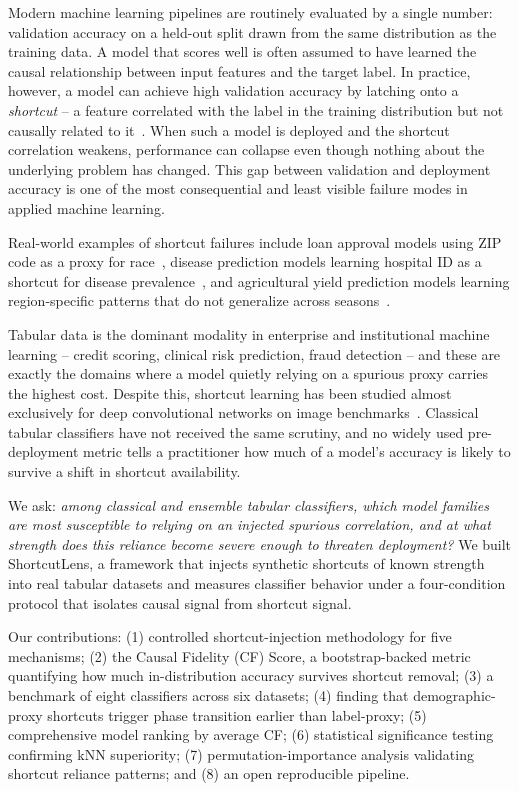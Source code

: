\documentclass[conference]{IEEEtran}
\begin{document}
Modern machine learning pipelines are routinely evaluated by a single number: validation accuracy on a held-out split drawn from the same distribution as the training data. A model that scores well is often assumed to have learned the causal relationship between input features and the target label. In practice, however, a model can achieve high validation accuracy by latching onto a \textit{shortcut} -- a feature correlated with the label in the training distribution but not causally related to it~\cite{geirhos2020shortcut}. When such a model is deployed and the shortcut correlation weakens, performance can collapse even though nothing about the underlying problem has changed. This gap between validation and deployment accuracy is one of the most consequential and least visible failure modes in applied machine learning.

Real-world examples of shortcut failures include loan approval models using ZIP code as a proxy for race~\cite{damour2020underspecification}, disease prediction models learning hospital ID as a shortcut for disease prevalence~\cite{sagawa2020dro}, and agricultural yield prediction models learning region-specific patterns that do not generalize across seasons~\cite{spas_dataset}.

Tabular data is the dominant modality in enterprise and institutional machine learning -- credit scoring, clinical risk prediction, fraud detection -- and these are exactly the domains where a model quietly relying on a spurious proxy carries the highest cost. Despite this, shortcut learning has been studied almost exclusively for deep convolutional networks on image benchmarks~\cite{hermann2020origins}. Classical tabular classifiers have not received the same scrutiny, and no widely used pre-deployment metric tells a practitioner how much of a model's accuracy is likely to survive a shift in shortcut availability.

We ask: \textit{among classical and ensemble tabular classifiers, which model families are most susceptible to relying on an injected spurious correlation, and at what strength does this reliance become severe enough to threaten deployment?} We built ShortcutLens, a framework that injects synthetic shortcuts of known strength into real tabular datasets and measures classifier behavior under a four-condition protocol that isolates causal signal from shortcut signal.

Our contributions: (1) controlled shortcut-injection methodology for five mechanisms; (2) the Causal Fidelity (CF) Score, a bootstrap-backed metric quantifying how much in-distribution accuracy survives shortcut removal; (3) a benchmark of eight classifiers across six datasets; (4) finding that demographic-proxy shortcuts trigger phase transition earlier than label-proxy; (5) comprehensive model ranking by average CF; (6) statistical significance testing confirming kNN superiority; (7) permutation-importance analysis validating shortcut reliance patterns; and (8) an open reproducible pipeline.
\end{document}
